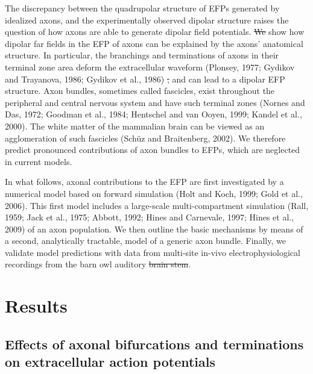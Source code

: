 \documentclass[]{article}
\providecommand{\DIFaddtex}[1]{{\protect\color{blue}\uwave{#1}}} %
\providecommand{\DIFdeltex}[1]{{\protect\color{red}\sout{#1}}}                      %
\providecommand{\DIFaddbegin}{} %
\providecommand{\DIFaddend}{} %
\providecommand{\DIFdelbegin}{} %
\providecommand{\DIFdelend}{} %
\providecommand{\DIFadd}[1]{\texorpdfstring{\DIFaddtex{#1}}{#1}} %
\providecommand{\DIFdel}[1]{\texorpdfstring{\DIFdeltex{#1}}{}} %
\begin{document}
The discrepancy between the quadrupolar structure of EFPs generated by
idealized axons, and the experimentally observed dipolar structure
raises the question of how axons are able to generate dipolar field
potentials. \DIFdelbegin \DIFdel{We }\DIFdelend \DIFaddbegin \DIFadd{In this manuscript we }\DIFaddend show how dipolar far fields in the EFP
of axons can be explained by the axons' anatomical structure. In
particular, the branchings and terminations of axons in their terminal
zone area deform the extracellular waveform (Plonsey, 1977; Gydikov and
Trayanova, 1986; Gydikov et al., 1986) \DIFdelbegin \DIFdel{, }\DIFdelend and can lead to a dipolar EFP
structure. Axon bundles, sometimes called fascicles, exist throughout
the peripheral and central nervous system and have such terminal zones
(Nornes and Das, 1972; Goodman et al., 1984; Hentschel and van Ooyen,
1999; Kandel et al., 2000). The white matter of the mammalian brain can
be viewed as an agglomeration of such fascicles (Schüz and Braitenberg,
2002). We therefore predict pronounced contributions of axon bundles to
EFPs, which are neglected in current models.

In what follows, axonal contributions to the EFP are first investigated
by a numerical model based on forward simulation (Holt and Koch, 1999;
Gold et al., 2006). This first model includes a large-scale
multi-compartment simulation (Rall, 1959; Jack et al., 1975; Abbott,
1992; Hines and Carnevale, 1997; Hines et al., 2009) of an axon
population. We then outline the basic mechanisms by means of a second,
analytically tractable, model of a generic axon bundle. Finally, we
validate model predictions with data from multi-site in-vivo
electrophysiological recordings from the barn owl auditory \DIFdelbegin \DIFdel{brain stem}\DIFdelend \DIFaddbegin \DIFadd{brainstem}\DIFaddend .

\section{Results}\label{results}

\subsection{Effects of axonal bifurcations and terminations on
extracellular action
potentials}\label{effects-of-axonal-bifurcations-and-terminations-on-extracellular-action-potentials}
\end{document}
